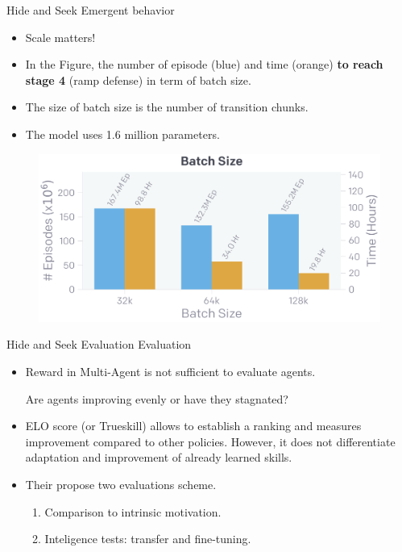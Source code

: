 \documentclass[9pt, hyperref={pdfusetitle,colorlinks=true,allcolors=DarkBlue}]{beamer}
\begin{document}
\begin{frame}{Hide and Seek Emergent behavior}
    \begin{itemize}
        \item Scale matters!
        \item In the Figure, the number of episode (blue) and time (orange) \textbf{to reach stage 4 }(ramp defense) in term of batch size.
        \item The size of batch size is the number of transition chunks.
        \item The model uses 1.6 million parameters.
    \end{itemize}{}
     
         \begin{figure}
        \centering
        \includegraphics[scale=0.2]{abl_batch_size.pdf}
    \end{figure}{}
\end{frame}{}

\begin{frame}{Hide and Seek Evaluation}
Evaluation
\vfill
    \begin{itemize}
        \item Reward in Multi-Agent is not sufficient to evaluate agents.
        
        Are agents improving evenly or have they stagnated?
        \vfill
        \item ELO score (or Trueskill) allows to establish a ranking and measures improvement compared to other policies. However, it does not differentiate adaptation and improvement of already learned skills.
        \vfill
        \item Their propose two evaluations scheme.
        \vfill
        \begin{enumerate}
            \item Comparison to intrinsic motivation.
            \vfill
            \item Inteligence tests: transfer and fine-tuning.
            \vfill
        \end{enumerate}{}
    \end{itemize}{}
\end{frame}{}
\end{document}
